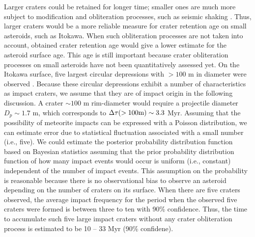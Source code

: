 \documentclass[3p,authoryear]{elsarticle}
\begin{document}
Larger craters could be retained for longer time; smaller ones are much more subject to modification and obliteration processes, such as seismic shaking \citep[i.e.,][]{michel2009}.
Thus, larger craters would be a more reliable measure for crater retention age on small asteroids, such as Itokawa.
When such obliteration processes are not taken into account, obtained crater retention age would give a lower estimate for the asteroid surface age.
This age is still important because crater obliteration processes on small asteroids have not been quantitatively assessed yet.
On the Itokawa surface, five largest circular depressions with $>100$ m in diameter were observed \citep{hirata2009}.
Because these circular depressions exhibit a number of characteristics as impact craters, we assume that they are of impact origin in the following discussion.
A crater $\sim 100$ m rim-diameter would require a projectile diameter $D_p\sim 1.7$ m, which corresponds to $\Delta \tau (>100 \rm{m})\sim 3.3$ Myr.
Assuming that the possibility of meteorite impacts can be expressed with a Poisson distribution, we can estimate error due to statistical fluctuation associated with a small number (i.e., five). We could estimate the posterior probability distribution function based on Bayesian statistics assuming that the prior probability distribution function of how many impact events would occur is uniform (i.e., constant) independent of the number of impact events.
This assumption on the probability is reasonable because there is no observational bias to observe an asteroid depending on the number of craters on its surface.
When there are five craters observed, the average impact frequency for the period when the observed five craters were formed is between three to ten with 90\% confidence.
Thus, the time to accumulate such five large impact craters without any crater obliteration process is estimated to be 10 -- 33 Myr (90\% confidene).
\end{document}
